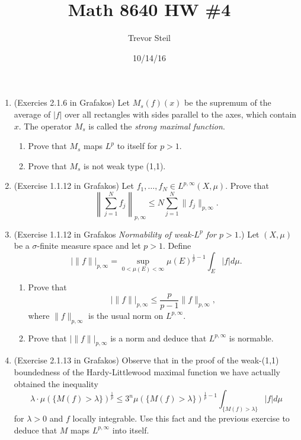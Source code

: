 \documentclass[a4paper]{article}
\title{Math 8640 HW \#4}
\date{10/14/16}
\author{Trevor Steil}
\begin{document}
\maketitle

\begin{enumerate}
  \item (Exercies 2.1.6 in Grafakos) Let $M_s(f)(x)$ be the supremum of the average of $|f|$ over all rectangles with sides parallel to the axes,
    which contain $x$. The operator $M_s$ is called the \textit{strong maximal function}.

    \begin{enumerate}
      \item Prove that $M_s$ maps $L^p$ to itself for $p>1$.
      \item Prove that $M_s$ is not weak type (1,1).
    \end{enumerate}

  \item (Exercise 1.1.12 in Grafakos) Let $f_1, \dots, f_N \in L^{p,\infty}(X,\mu)$. Prove that
    \[ \left\| \sum_{j=1}^N f_j \right\|_{p,\infty} \leq N \sum_{j=1}^N \| f_j \|_{p,\infty} .\]

  \item (Exercise 1.1.12 in Grafakos \textit{Normability of weak-$L^p$ for $p>1$.}) Let $(X,\mu)$ be a $\sigma$-finite measure space and let $p>1$.
    Define
    \[ | \| f \| |_{p,\infty} = \sup_{0 < \mu(E) < \infty} \mu(E)^{\frac{1}{p} - 1} \int_{E}^{}|f| d \mu .\]

    \begin{enumerate}
      \item Prove that
        \[ | \| f \| |_{p,\infty} \leq \frac{p}{p-1} \|f\|_{p,\infty} ,\]
        where $\|f\|_{p,\infty}$ is the usual norm on $L^{p,\infty}$.

      \item Prove that $| \| f \| |_{p,\infty}$ is a norm and deduce that $L^{p,\infty}$ is normable.
    \end{enumerate}

  \item (Exercise 2.1.13 in Grafakos) Observe that in the proof of the weak-(1,1) boundedness of the Hardy-Littlewood maximal function we have
    actually obtained the inequality
    \[ \lambda \cdot \mu( \{ M(f) > \lambda \} )^{\frac{1}{p}} \leq 3^n \mu( \{M(f) > \lambda \})^{\frac{1}{p} - 1} \int_{\{M(f)>\lambda\}}^{} |f|
    d\mu \]
    for $\lambda > 0$ and $f$ locally integrable. Use this fact and the previous exercise to deduce that $M$ maps $L^{p,\infty}$ into itself.
\end{enumerate}
\end{document}
